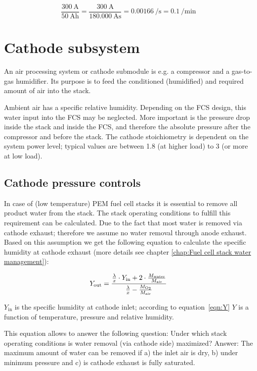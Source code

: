 \documentclass[11pt,a4paper,english,twoside]{scrreprt}
\begin{document}
\[
\frac{\SI{300}{\ampere}}{\SI{50}{\ampere\hour}} = \frac{\SI{300}{\ampere}}{\SI{180,000}{\ampere\second}} = \SI{0.00166}{\per\second} = \SI{0.1}{\per\minute}
\]


\section{Cathode subsystem}

An air processing system or cathode submodule is e.g. a compressor and a gas-to-gas humidifier. Its purpose is to feed the conditioned (humidified) and required amount of air into the stack.

Ambient air has a specific relative humidity. Depending on the FCS design, this water input into the FCS may be neglected. More important is the pressure drop inside the stack and inside the FCS, and therefore the absolute pressure after the compressor and before the stack. The cathode stoichiometry is dependent on the system power level; typical values are between 1.8 (at higher load) to 3 (or more at low load).


\subsection{Cathode pressure controls}

In case of (low temperature) PEM fuel cell stacks it is essential to remove all product water from the stack. The stack operating conditions to fulfill this requirement can be calculated. Due to the fact that most water is removed via cathode exhaust; therefore we assume no water removal through anode exhaust. Based on this assumption we get the following equation to calculate the specific humidity at cathode exhaust (more details see chapter \ref{chap:Fuel cell stack water management}):

\begin{equation}
  \label{eqn:Y.So.C}
  Y_\text{out} = \frac{\frac{\lambda}{x} \cdot Y_\text{in} + 2\cdot \frac{M_\text{water}}{M_\text{air}}}{\frac{\lambda}{x}-\frac{M_{\ce{O2}}}{M_\text{air}}}
\end{equation}


$Y_\mathrm{in}$ is the specific humidity at cathode inlet; according to equation~\ref{eqn:Y} $Y$ is a function of temperature, pressure and relative humidity.

This equation allows to answer the following question: Under which stack operating conditions is water removal (via cathode side) maximized?
Answer: The maximum amount of water can be removed if a) the inlet air is dry, b) under minimum pressure and c) is cathode exhaust is fully saturated. 
\end{document}
